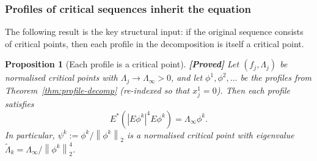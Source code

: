 \documentclass[12pt]{article}
\newtheorem{proposition}[theorem]{Proposition}
\theoremstyle{definition}
\theoremstyle{remark}
\newcommand{\norm}[1]{\left\|#1\right\|}
\newcommand{\proven}{\textbf{\color{teal}[Proved]}}
\begin{document}
\subsubsection{Profiles of critical sequences inherit the equation}

The following result is the key structural input: if the original
sequence consists of critical points, then each profile in the
decomposition is itself a critical point.

\begin{proposition}[Each profile is a critical point]
  \label{prop:profile-critical}
  \proven\quad
  Let $(f_j,\Lambda_j)$ be normalised critical points with
  $\Lambda_j\to\Lambda_\infty>0$, and let $\phi^1,\phi^2,\ldots$
  be the profiles from Theorem~\ref{thm:profile-decomp} (re-indexed
  so that $x_j^1=0$).  Then each profile satisfies
  \begin{equation}\label{eq:profile-EL}
    E^*(|E\phi^k|^4E\phi^k) = \Lambda_\infty\phi^k.
  \end{equation}
  In particular, $\psi^k:=\phi^k/\norm{\phi^k}_2$ is a normalised
  critical point with eigenvalue
  $\widetilde\Lambda_k=\Lambda_\infty/\norm{\phi^k}_2^4$.
\end{proposition}
\end{document}
